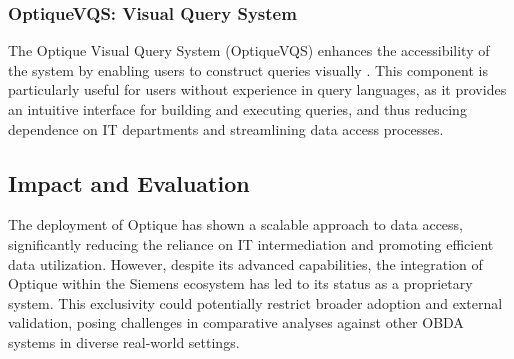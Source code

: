 \subsubsection{OptiqueVQS: Visual Query System}
The Optique Visual Query System (OptiqueVQS) enhances the accessibility of the system by enabling users to construct queries visually \cite{DBLP:journals/semweb/SoyluKZJGSHSBLH18}. This component is particularly useful for users without experience in query languages, as it provides an intuitive interface for building and executing queries, and thus reducing dependence on \ac{IT} departments and streamlining data access processes.
\subsection{Impact and Evaluation}
The deployment of Optique has shown a scalable approach to data access, significantly reducing the reliance on \ac{IT} intermediation and promoting efficient data utilization. 
However, despite its advanced capabilities, the integration of Optique within the Siemens ecosystem has led to its status as a proprietary system. This exclusivity could potentially restrict broader adoption and external validation, posing challenges in comparative analyses against other \ac{OBDA} systems in diverse real-world settings.